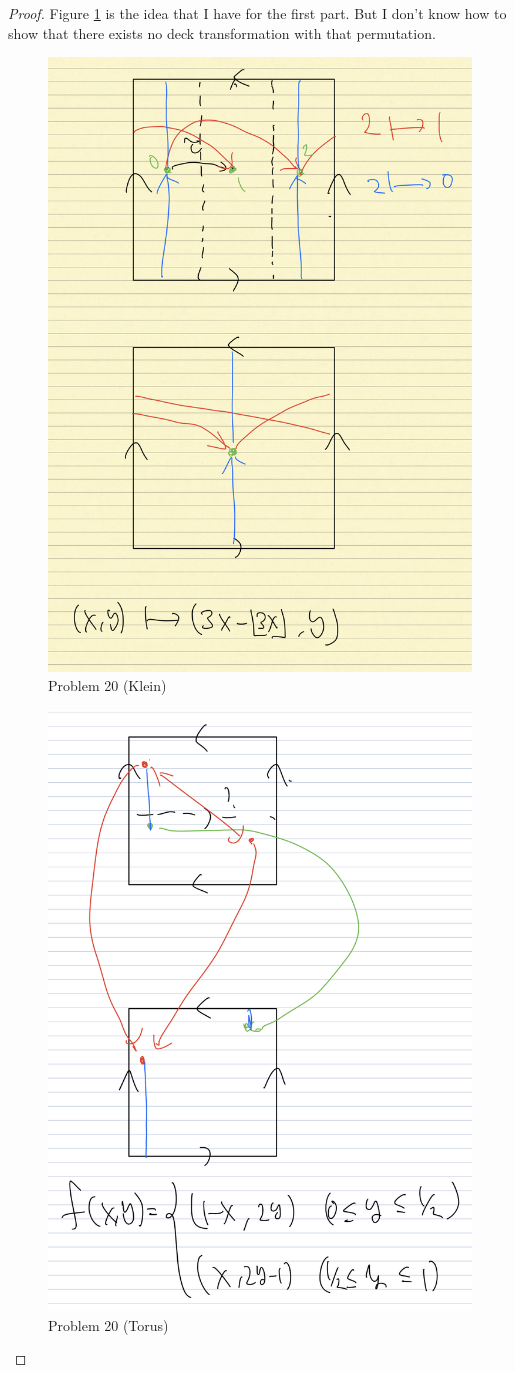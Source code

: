 \documentclass[12pt, psamsfonts]{amsart}
\theoremstyle{definition}
\theoremstyle{remark}
\numberwithin{equation}{section}
\begin{document}
\begin{proof}
  Figure \ref{fig:non_normal_covering_klein} is the idea that I have for the first part.
  But I don't know how to show that there exists no deck transformation with that permutation.
  \begin{figure}
    \includegraphics[width=.5\linewidth]{non_normal_covering_klein.jpeg}
    \caption{Problem 20 (Klein)}
    \label{fig:non_normal_covering_klein}
  \end{figure}

  \begin{figure}
    \includegraphics[width=.5\linewidth]{non_normal_covering_torus.jpeg}
    \caption{Problem 20 (Torus)}
    \label{fig:non_normal_covering_torus}
  \end{figure}
  
\end{proof}
\end{document}
